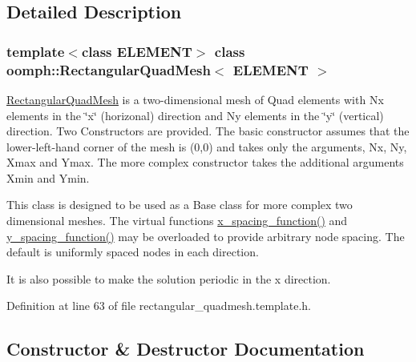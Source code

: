 \subsection{Detailed Description}
\subsubsection*{template$<$class E\+L\+E\+M\+E\+NT$>$\newline
class oomph\+::\+Rectangular\+Quad\+Mesh$<$ E\+L\+E\+M\+E\+N\+T $>$}

\hyperlink{classoomph_1_1RectangularQuadMesh}{Rectangular\+Quad\+Mesh} is a two-\/dimensional mesh of Quad elements with Nx elements in the \char`\"{}x\char`\"{} (horizonal) direction and Ny elements in the \char`\"{}y\char`\"{} (vertical) direction. Two Constructors are provided. The basic constructor assumes that the lower-\/left-\/hand corner of the mesh is (0,0) and takes only the arguments, Nx, Ny, Xmax and Ymax. The more complex constructor takes the additional arguments Xmin and Ymin.

This class is designed to be used as a Base class for more complex two dimensional meshes. The virtual functions \hyperlink{classoomph_1_1RectangularQuadMesh_ad4c2f349cf201cb3107f0a4e5447c16f}{x\+\_\+spacing\+\_\+function()} and \hyperlink{classoomph_1_1RectangularQuadMesh_ae78204de1f176cdf2e819673bd34e78a}{y\+\_\+spacing\+\_\+function()} may be overloaded to provide arbitrary node spacing. The default is uniformly spaced nodes in each direction.

It is also possible to make the solution periodic in the x direction. 

Definition at line 63 of file rectangular\+\_\+quadmesh.\+template.\+h.



\subsection{Constructor \& Destructor Documentation}
\mbox{\label{classoomph_1_1RectangularQuadMesh_aeda49fb3896e9e3aec328391b196a6bf}} 
